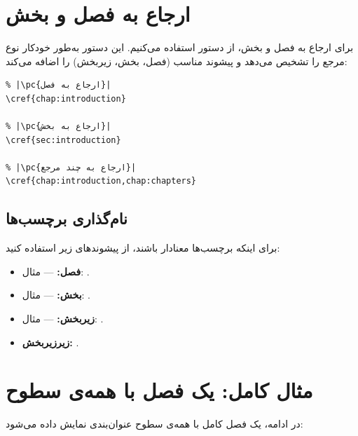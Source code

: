 \section{ارجاع به فصل و بخش}
\label{sec:chapters-references}

برای ارجاع به فصل و بخش، از دستور 
استفاده می‌کنیم. این دستور به‌طور خودکار نوع
مرجع را تشخیص می‌دهد و پیشوند مناسب (فصل،
بخش، زیربخش) را اضافه می‌کند:

\begin{latin}
\begin{verbatim}
% |\pc{ارجاع به فصل}|
\cref{chap:introduction}

% |\pc{ارجاع به بخش}|
\cref{sec:introduction}

% |\pc{ارجاع به چند مرجع}|
\cref{chap:introduction,chap:chapters}
\end{verbatim}
\end{latin}


\subsection{نام‌گذاری برچسب‌ها}
\label{sec:chapters-label-naming}

برای اینکه برچسب‌ها معنادار باشند، از
پیشوندهای زیر استفاده کنید:

\begin{itemize}
    \item \textbf{فصل:}  —
    مثال: .
    \item \textbf{بخش:}  —
    مثال: .
    \item \textbf{زیربخش:}  —
    مثال: .
    \item \textbf{زیرزیربخش:} .
\end{itemize}


\section{مثال کامل: یک فصل با همه‌ی سطوح}
\label{sec:chapters-full-example}

در ادامه، یک فصل کامل با همه‌ی سطوح عنوان‌بندی
نمایش داده می‌شود:

